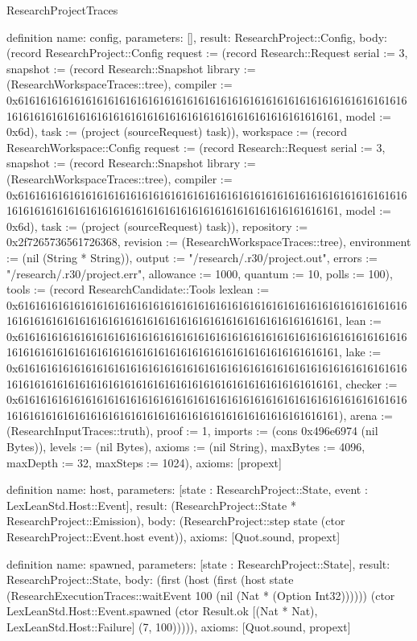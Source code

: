 \begin{lexlean}{ResearchProjectTraces}
\begin{semanticmodule}
definition{
 name: config,
 parameters: [],
 result: ResearchProject::Config,
 body: (record ResearchProject::Config {request := (record Research::Request {serial := 3, snapshot := (record Research::Snapshot {library := (ResearchWorkspaceTraces::tree), compiler := 0x61616161616161616161616161616161616161616161616161616161616161616161616161616161616161616161616161616161616161616161616161616161, model := 0x6d}), task := (project (sourceRequest) task)}), workspace := (record ResearchWorkspace::Config {request := (record Research::Request {serial := 3, snapshot := (record Research::Snapshot {library := (ResearchWorkspaceTraces::tree), compiler := 0x61616161616161616161616161616161616161616161616161616161616161616161616161616161616161616161616161616161616161616161616161616161, model := 0x6d}), task := (project (sourceRequest) task)}), repository := 0x2f7265736561726368, revision := (ResearchWorkspaceTraces::tree), environment := (nil (String * String)), output := "/research/.r30/project.out", errors := "/research/.r30/project.err", allowance := 1000, quantum := 10, polls := 100}), tools := (record ResearchCandidate::Tools {lexlean := 0x61616161616161616161616161616161616161616161616161616161616161616161616161616161616161616161616161616161616161616161616161616161, lean := 0x61616161616161616161616161616161616161616161616161616161616161616161616161616161616161616161616161616161616161616161616161616161, lake := 0x61616161616161616161616161616161616161616161616161616161616161616161616161616161616161616161616161616161616161616161616161616161, checker := 0x61616161616161616161616161616161616161616161616161616161616161616161616161616161616161616161616161616161616161616161616161616161}), arena := (ResearchInputTraces::truth), proof := 1, imports := (cons 0x496e6974 (nil Bytes)), levels := (nil Bytes), axioms := (nil String), maxBytes := 4096, maxDepth := 32, maxSteps := 1024}),
 axioms: [propext]
}

definition{
 name: host,
 parameters: [state : ResearchProject::State, event : LexLeanStd.Host::Event],
 result: (ResearchProject::State * ResearchProject::Emission),
 body: (ResearchProject::step state (ctor ResearchProject::Event.host event)),
 axioms: [Quot.sound, propext]
}

definition{
 name: spawned,
 parameters: [state : ResearchProject::State],
 result: ResearchProject::State,
 body: (first (host (first (host state (ResearchExecutionTraces::waitEvent 100 (nil (Nat * (Option Int32)))))) (ctor LexLeanStd.Host::Event.spawned (ctor Result.ok [(Nat * Nat), LexLeanStd.Host::Failure] (7, 100))))),
 axioms: [Quot.sound, propext]
}


\end{semanticmodule}
\end{lexlean}
